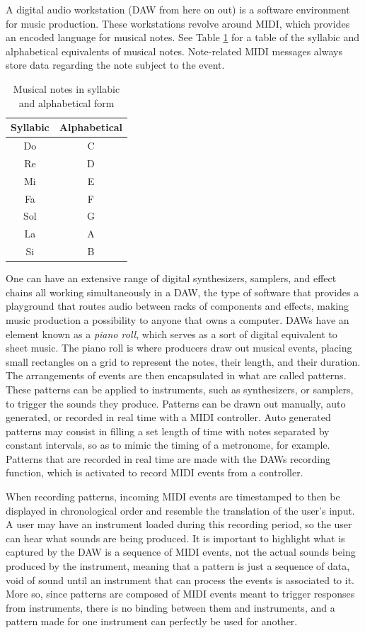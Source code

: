 \documentclass[12pt, a4paper, hidelinks]{article}
\begin{document}
 	A digital audio workstation (DAW from here on out) is a software environment for music production. These workstations revolve around MIDI, which provides an encoded language for musical notes. See Table \ref{table:notes} for a table of the syllabic and alphabetical equivalents of musical notes. Note-related MIDI messages always store data regarding the note subject to the event. 
 	\par
	\begin{table}[h] %
		\centering
		\begin{tabular}{c c}
			Syllabic & Alphabetical \tabularnewline
			\midrule
			Do  & C \tabularnewline
			Re  & D \tabularnewline
			Mi  & E \tabularnewline
			Fa  & F \tabularnewline
			Sol & G \tabularnewline
			La  & A \tabularnewline
			Si  & B \tabularnewline
		\end{tabular}
		\caption{Musical notes in syllabic and alphabetical form}
		\label{table:notes}
	\end{table} 
	One can have an extensive range of digital synthesizers, samplers, and effect chains all working simultaneously in a DAW, the type of software that provides a playground that routes audio between racks of components and effects, making music production a possibility to anyone that owns a computer. DAWs have an element known as a \textit{piano roll}, which serves as a sort of digital equivalent to sheet music. The piano roll is where producers draw out musical events, placing small rectangles on a grid to represent the notes, their length, and their duration. %
	The arrangements of events are then encapsulated in what are called patterns. These patterns can be applied to instruments, such as synthesizers, or samplers, to trigger the sounds they produce. Patterns can be drawn out manually, auto generated, or recorded in real time with a MIDI controller. Auto generated patterns may consist in filling a set length of time with notes separated by constant intervals, so as to mimic the timing of a metronome, for example. Patterns that are recorded in real time are made with the DAWs recording function, which is activated to record MIDI events from a controller. \par 

	When recording patterns, incoming MIDI events are timestamped to then be displayed in chronological order and resemble the translation of the user's input. A user may have an instrument loaded during this recording period, so the user can hear what sounds are being produced. It is important to highlight what is captured by the DAW is a sequence of MIDI events, not the actual sounds being produced by the instrument, meaning that a pattern is just a sequence of data, void of sound until an instrument that can process the events is associated to it. More so, since patterns are composed of MIDI events meant to trigger responses from instruments, there is no binding between them and instruments, and a pattern made for one instrument can perfectly be used for another. \par 
	
\end{document}
